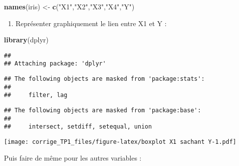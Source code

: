\documentclass[
]{article}
\newenvironment{Shaded}{\begin{snugshade}}{\end{snugshade}}
\newcommand{\DataTypeTok}[1]{\textcolor[rgb]{0.13,0.29,0.53}{#1}}
\newcommand{\KeywordTok}[1]{\textcolor[rgb]{0.13,0.29,0.53}{\textbf{#1}}}
\newcommand{\NormalTok}[1]{#1}
\newcommand{\OperatorTok}[1]{\textcolor[rgb]{0.81,0.36,0.00}{\textbf{#1}}}
\newcommand{\StringTok}[1]{\textcolor[rgb]{0.31,0.60,0.02}{#1}}
\providecommand{\tightlist}{%
  \setlength{\itemsep}{0pt}\setlength{\parskip}{0pt}}
\begin{document}
\begin{Shaded}
\begin{Highlighting}[]
\KeywordTok{names}\NormalTok{(iris) <-}\StringTok{ }\KeywordTok{c}\NormalTok{(}\StringTok{"X1"}\NormalTok{,}\StringTok{"X2"}\NormalTok{,}\StringTok{"X3"}\NormalTok{,}\StringTok{"X4"}\NormalTok{,}\StringTok{"Y"}\NormalTok{) }
\end{Highlighting}
\end{Shaded}

\begin{enumerate}
\def\labelenumi{\arabic{enumi}.}
\setcounter{enumi}{4}
\tightlist
\item
  Représenter graphiquement le lien entre X1 et Y :
\end{enumerate}

\begin{Shaded}
\begin{Highlighting}[]
\KeywordTok{library}\NormalTok{(dplyr)}
\end{Highlighting}
\end{Shaded}

\begin{verbatim}
## 
## Attaching package: 'dplyr'
\end{verbatim}

\begin{verbatim}
## The following objects are masked from 'package:stats':
## 
##     filter, lag
\end{verbatim}

\begin{verbatim}
## The following objects are masked from 'package:base':
## 
##     intersect, setdiff, setequal, union
\end{verbatim}

\begin{Shaded}
\end{Shaded}

\texttt{[image: corrige\_TP1\_files/figure-latex/boxplot X1 sachant Y-1.pdf]}

Puis faire de même pour les autres variables :
\end{document}

